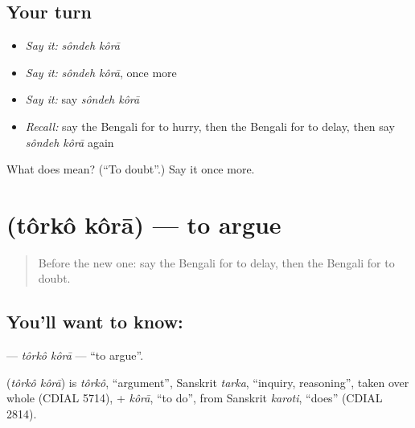 \subsection*{Your turn}
\begin{itemize}
\raggedright
  \item \emph{Say it:} \emph{sôndeh kôrā}
  \item \emph{Say it:} \emph{sôndeh kôrā}, once more
  \item \emph{Say it:} say \emph{sôndeh kôrā}
  \item \emph{Recall:} say the Bengali for to hurry, then the Bengali for to delay, then say \emph{sôndeh kôrā} again
\end{itemize}

\begin{tcolorbox}[breakable,colback=teal!4,colframe=teal!35!black,title={Before you move on}]
What does   mean? (\textquotedblleft{}To doubt\textquotedblright{}.) Say it once more.
\end{tcolorbox}
\section[\texorpdfstring{\bn{তর্ক} \bn{করা} (tôrkô kôrā)}{তর্ক করা (tôrkô kôrā)}]{  (tôrkô kôrā) — to argue}

\label{lesson:BN-C150-torko-kora}



\begin{quote}
Before the new one: say the Bengali for to delay, then the Bengali for to doubt.
\end{quote}

\subsection*{You'll want to know:  }
\textbf{ } — \emph{tôrkô kôrā} — \textquotedblleft{}to argue\textquotedblright{}.

\begin{cousinweb}
\textbf{ } (\emph{tôrkô kôrā}) is \emph{tôrkô}, \textquotedblleft{}argument\textquotedblright{}, Sanskrit \emph{tarka}, \textquotedblleft{}inquiry, reasoning\textquotedblright{}, taken over whole (CDIAL 5714), + \emph{kôrā}, \textquotedblleft{}to do\textquotedblright{}, from Sanskrit \emph{karoti}, \textquotedblleft{}does\textquotedblright{} (CDIAL 2814).
\end{cousinweb}

